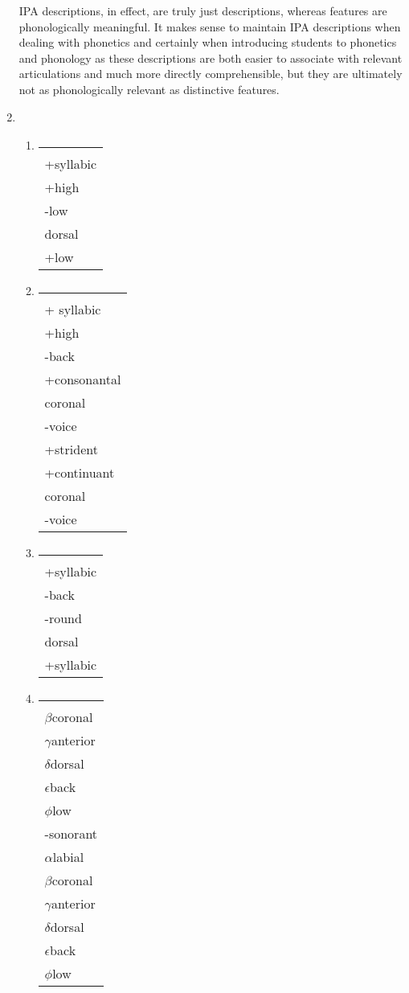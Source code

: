 \documentclass{article}
\newcommand{\rulealign}[1]{
    \begin{tabular}[t]{l}
      \\
      #1
    \end{tabular}
  }
\begin{document}
\begin{enumerate}
    IPA descriptions, in effect, are truly just descriptions, whereas features are phonologically meaningful.
    It makes sense to maintain IPA descriptions when dealing with phonetics and certainly when introducing students to phonetics and phonology as these descriptions are both easier to associate with relevant articulations and much more directly comprehensible, but they are ultimately not as phonologically relevant as distinctive features.
    \item
    \begin{enumerate}
      \item \rulealign{
        \phonr{\phonfeat[l]{-consonantal \\ +syllabic \\ +high}}{\phonfeat[l]{-high \\ -low}}{\phonfeat[l]{-continuant \\ dorsal \\ +low}}
      }
      \item \rulealign{
        \phonb{ø}{\phonfeat[l]{-consonantal \\ + syllabic \\ +high \\ -back}}{\phonfeat[l]{-sonorant \\ +consonantal \\ coronal \\ -voice \\ +strident}}{\phonfeat[l]{-sonorant \\ +continuant \\ coronal \\ -voice}}
      }
      \item \rulealign{
        \phonr{\phonfeat[l]{-consonantal \\ +syllabic \\ -back \\ -round}}{\phonfeat[l]{-syllabic \\ dorsal}}{\phonfeat[l]{-consonantal \\ +syllabic}}
      }
      \item \rulealign{
        \phonr{\phonfeat[l]{nasal}}{\phonfeat[l]{$\alpha$labial \\ $\beta$coronal \\ $\gamma$anterior \\ $\delta$dorsal \\ $\epsilon$back \\ $\phi$low}}{\phonfeat[l]{-continuant \\ -sonorant \\ $\alpha$labial \\ $\beta$coronal \\ $\gamma$anterior \\ $\delta$dorsal \\ $\epsilon$back \\ $\phi$low}}
}
\end{enumerate}
\end{enumerate}
\end{document}

